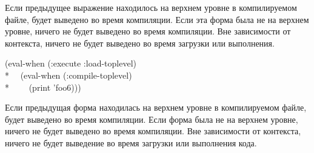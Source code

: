 \begin{newer}
\begin{defspec}
Если предыдущее выражение находилось на верхнем уровне в компилируемом файле,
 будет выведено во время компиляции. Если эта форма была не на верхнем
уровне, ничего не будет выведено во время компиляции. Вне зависимости от 
контекста, ничего не будет выведено во время загрузки или выполнения.

\begin{lisp}
(eval-when (:execute :load-toplevel) \\*
~~(eval-when (:compile-toplevel) \\*
~~~~(print 'foo6)))
\end{lisp}

Если предыдущая форма находилась на верхнем уровне в компилируемом файле,
 будет выведено во время компиляции. Если форма была не на верхнем
уровне, ничего не будет выведено во время компиляции. Вне зависимости от
контекста, ничего не будет выведение во время загрузки или выполнения кода.
\end{defspec}

\end{newer}
\fi